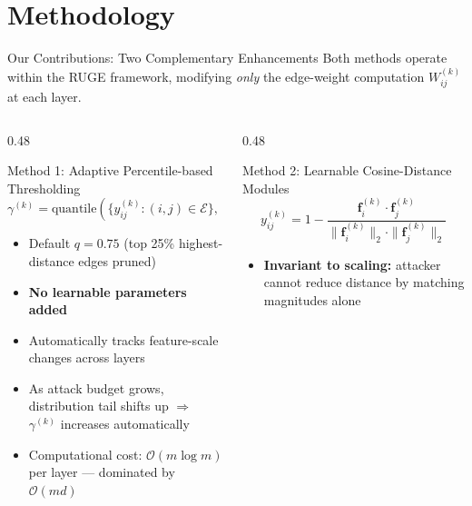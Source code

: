 \documentclass[aspectratio=169]{beamer}
\begin{document}
\section{Methodology}

\begin{frame}{Our Contributions: Two Complementary Enhancements}
  \tiny
  Both methods operate within the RUGE framework, modifying \emph{only} the edge-weight computation $W^{(k)}_{ij}$ at each layer.
  \vspace{8pt}
  \begin{columns}[T]
    \begin{column}{0.48\textwidth}
      \begin{block}{Method 1: Adaptive Percentile-based Thresholding}
        \vspace{4pt}
        \[
          \gamma^{(k)} = \text{quantile}\!\left(\{y^{(k)}_{ij} : (i,j)\in\mathcal{E}\},\; q\right)
        \]
        \vspace{2pt}
        \begin{itemize}
          \item Default $q = 0.75$ (top 25\% highest-distance edges pruned)
          \item \textbf{No learnable parameters added}
          \item Automatically tracks feature-scale changes across layers
          \item As attack budget grows, distribution tail shifts up $\Rightarrow$ $\gamma^{(k)}$ increases automatically
          \item Computational cost: $\mathcal{O}(m \log m)$ per layer --- dominated by $\mathcal{O}(md)$
        \end{itemize}
      \end{block}
    \end{column}
    \begin{column}{0.48\textwidth}
      \begin{block}{Method 2: Learnable Cosine-Distance Modules}
        \vspace{4pt}
        \[
          y^{(k)}_{ij} = 1 - \frac{\mathbf{f}^{(k)}_i \cdot \mathbf{f}^{(k)}_j}{\|\mathbf{f}^{(k)}_i\|_2 \cdot \|\mathbf{f}^{(k)}_j\|_2}
        \]
        \vspace{2pt}
        \begin{itemize}
          \item \textbf{Invariant to scaling:} attacker cannot reduce distance by matching magnitudes alone

\end{itemize}
\end{block}
\end{column}
\end{columns}
\end{frame}
\end{document}
